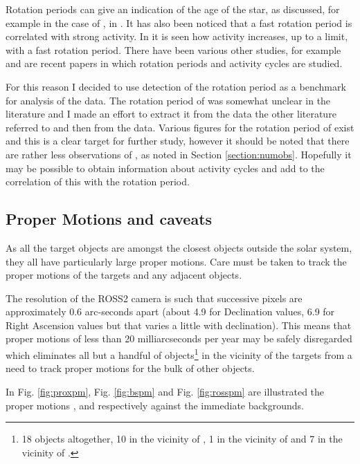Rotation periods can give an indication of the age of the star, as discussed,
for example in the case of \ross, in \citet{wargelin08}. It has also been
noticed that a fast rotation period is correlated with strong activity. In
\citet{mohanty03} it is seen how activity increases, up to a limit, with a fast
rotation period. There have been various other studies, for example
\citet{aizawa22} and \citet{magaudda22} are recent papers in which rotation
periods and activity cycles are studied.

For this reason I decided to use detection of the rotation period as a benchmark
for analysis of the {\rem} data. The rotation period of {\ross} was somewhat
unclear in the literature and I made an effort to extract it from the data the
other literature referred to and then from the {\rem} data. Various figures for
the rotation period of {\bstar} exist and this is a clear target for further
study, however it should be noted that there are rather less observations of
\bstar, as noted in Section \ref{section:numobs}. Hopefully it may be possible
to obtain information about activity cycles and add to the correlation of this
with the rotation period.

\subsection{Proper Motions and caveats}
\protect\label{section:propermotions}
As all the target objects are amongst the closest objects outside the solar
system, they all have particularly large proper motions. Care must be taken to
track the proper motions of the targets and any adjacent objects.

The resolution of the ROSS2 camera is such that successive pixels
are approximately 0.6 arc-seconds apart (about 4.9 for Declination values, 6.9
for Right Ascension values but that varies a little with declination). This
means that proper motions of less than 20 milliarcseconds per year may be safely
disregarded which eliminates all but a handful of objects\footnote{18 objects
altogether, 10 in the vicinity of \prox, 1 in the vicinity of {\bstar} and 7 in
the vicinity of \ross.} in the vicinity of the targets from a need to track proper
motions for the bulk of other objects.

In Fig. \ref{fig:proxpm}, Fig. \ref{fig:bspm} and Fig. \ref{fig:rosspm} are
illustrated the proper motions \prox, {\bstar} and {\ross} respectively against
the immediate backgrounds.

